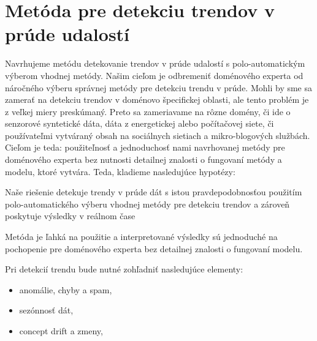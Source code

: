 \chapter{Metóda pre detekciu trendov v prúde udalostí}
\label{Metóda pre detekciu trendov v prúde udalostí}
Navrhujeme metódu detekovanie trendov v prúde udalostí s polo-automatickým výberom vhodnej metódy. Našim cieľom je odbremeniť doménového experta od náročného výberu správnej metódy pre detekciu trendu v prúde. Mohli by sme sa zamerať na detekciu trendov v doménovo špecifickej oblasti, ale tento problém je z veľkej miery preskúmaný. Preto sa zameriavame na rôzne domény, či ide o senzorové syntetické dáta, dáta z energetickej alebo počítačovej siete, či používateľmi vytváraný obsah na sociálnych sietiach a mikro-blogových službách. Cieľom je teda: použiteľnosť a jednoduchosť nami navrhovanej metódy pre doménového experta bez nutnosti detailnej znalosti o fungovaní metódy a modelu, ktoré vytvára.
Teda, kladieme nasledujúce hypotézy:
\begin{hypothesis}{Naše riešenie detekuje trendy v prúde dát s istou pravdepodobnosťou použitím polo-automatického výberu vhodnej metódy pre detekciu trendov a zároveň poskytuje výsledky v reálnom čase}
\end{hypothesis}
\begin{hypothesis}{Metóda je ľahká na použitie a interpretované výsledky sú jednoduché na pochopenie pre doménového experta bez detailnej znalosti o fungovaní modelu.}
\end{hypothesis}

Pri detekcií trendu bude nutné zohľadniť nasledujúce elementy:
\begin{itemize}
	\item anomálie, chyby a spam,
	\item sezónnosť dát,
	\item concept drift a zmeny,
\end{itemize}